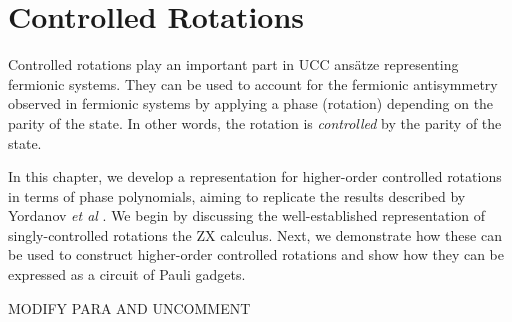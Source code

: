 \chapter{Controlled Rotations}%
\label{controlled-rotations}

Controlled rotations play an important part in UCC ansätze representing fermionic systems. They can be used to account for the fermionic antisymmetry observed in fermionic systems by applying a phase (rotation) depending on the parity of the state. In other words, the rotation is \textit{controlled} by the parity of the state.

In this chapter, we develop a representation for higher-order controlled rotations in terms of phase polynomials, aiming to replicate the results described by Yordanov \textit{et al} \cite{Yordanov2020}. We begin by discussing the well-established representation of singly-controlled rotations the ZX calculus. Next, we demonstrate how these can be used to construct higher-order controlled rotations and show how they can be expressed as a circuit of Pauli gadgets.

MODIFY PARA AND UNCOMMENT
